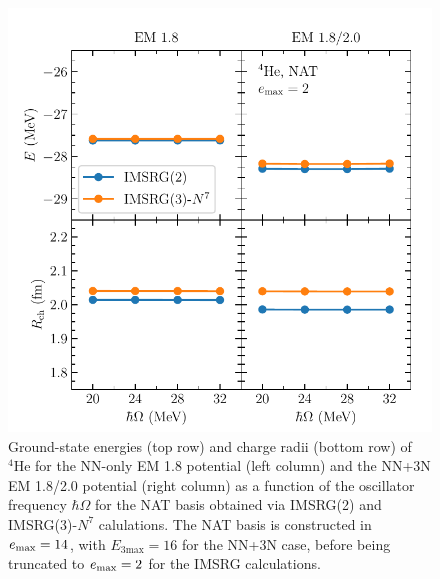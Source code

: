 \begin{figure}[t!]
    \begin{center}
        \includegraphics{thesis/doc/images/he4_NAT_results}
    \end{center}
    \caption{
        Ground-state energies (top row) and charge radii (bottom row)
        of ${}^{4}\text{He}$
        for the NN-only EM 1.8 potential (left column)
        and the NN+3N EM 1.8/2.0 potential (right column)
        as a function of the oscillator frequency $\hbar \Omega$
        for the NAT basis
        obtained via IMSRG(2) and IMSRG(3)-$N^7$ calulations.
        The NAT basis is constructed in $e_{\text{max}}=14$,
        with $E_{3\text{max}}=16$ for the NN+3N case,
        before being truncated to $e_{\text{max}}=2$ for the IMSRG calculations.
    }\label{fig:he4_imsrg3_nat}
\end{figure}

